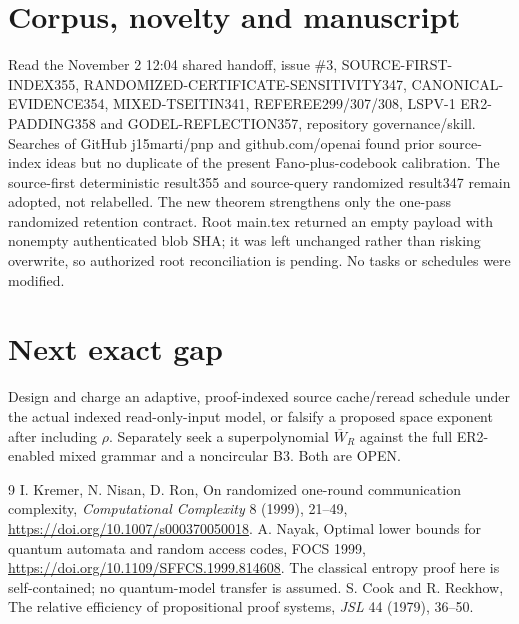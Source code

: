 \documentclass[11pt]{article}
\begin{document}
\section*{Corpus, novelty and manuscript}
Read the November 2 12:04 shared handoff, issue \#3, SOURCE-FIRST-INDEX355, RANDOMIZED-CERTIFICATE-SENSITIVITY347, CANONICAL-EVIDENCE354, MIXED-TSEITIN341, REFEREE299/307/308, LSPV-1 ER2-PADDING358 and GODEL-REFLECTION357, repository governance/skill. Searches of GitHub j15marti/pnp and github.com/openai found prior source-index ideas but no duplicate of the present Fano-plus-codebook calibration. The source-first deterministic result355 and source-query randomized result347 remain adopted, not relabelled. The new theorem strengthens only the one-pass randomized retention contract. Root main.tex returned an empty payload with nonempty authenticated blob SHA; it was left unchanged rather than risking overwrite, so authorized root reconciliation is pending. No tasks or schedules were modified.
\section*{Next exact gap}
Design and charge an adaptive, proof-indexed source cache/reread schedule under the actual indexed read-only-input model, or falsify a proposed space exponent after including $\rho$. Separately seek a superpolynomial $\overline W_R$ against the full ER2-enabled mixed grammar and a noncircular B3. Both are OPEN.
\begin{thebibliography}{9}
 I. Kremer, N. Nisan, D. Ron, On randomized one-round communication complexity, \emph{Computational Complexity} 8 (1999), 21--49, \url{https://doi.org/10.1007/s000370050018}.
 A. Nayak, Optimal lower bounds for quantum automata and random access codes, FOCS 1999, \url{https://doi.org/10.1109/SFFCS.1999.814608}. The classical entropy proof here is self-contained; no quantum-model transfer is assumed.
 S. Cook and R. Reckhow, The relative efficiency of propositional proof systems, \emph{JSL} 44 (1979), 36--50.
\end{thebibliography}
\end{document}
